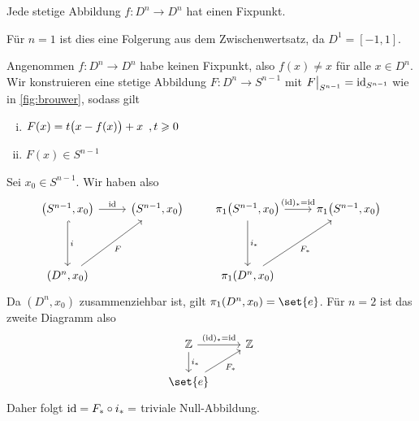 \begin{satz}[{name={Fixpunktsatz von Brouwer}}]
	Jede stetige Abbildung $f \colon D^n \to D^n$ hat einen Fixpunkt.
\end{satz}
\begin{beweis}[für $n\le 2$]
	Für $n=1$ ist dies eine Folgerung aus dem Zwischenwertsatz, da $D^1= [-1,1]$.
	
	Angenommen $f \colon D^n \to D^n$ habe keinen Fixpunkt, also $f(x) \neq x$ für alle $x \in D^n$. 
	Wir konstruieren eine stetige Abbildung $F \colon D^n \to S^{n-1}$ mit $F\big|_{S^{n-1}} = \id_{S^{n-1}}$ wie in \cref{fig:brouwer}, sodass gilt
	
	\begin{minipage}{0.45\textwidth}
		\begin{enumerate}[(i)]
			\item $F(x) = t \enbrace[\big]{x- f(x)} + x \enspace, t\ge 0$
			\item $F(x) \in S^{n-1}$
		\end{enumerate}
	\end{minipage} \quad 
	\begin{minipage}{0.45\textwidth}
		\captionsetup{type=figure, skip=4pt, name=Abb.}
	\end{minipage}
	
	\noindent Sei $x_0 \in S^{n-1}$. Wir haben also
	\[
		\begin{tikzcd}[row sep=4em]
			\enbrace*{S^{n-1}, x_0} \rar{\id} \dar[hook]{i} & \enbrace*{S^{n-1}, x_0} \\
			\enbrace*{D^n, x_0} \urar[swap]{F}
		\end{tikzcd}
		\qquad \begin{tikzcd}[row sep=4em]
			\pi_1 \enbrace*{S^{n-1}, x_0} \rar{(\id)_* = \id}  \dar{i_*}& \pi_1 \enbrace*{S^{n-1}, x_0} \\
			\pi_1 \enbrace*{D^n, x_0} \urar[swap]{F_*}   
		\end{tikzcd}
	\]
	Da $(D^n, x_0)$ zusammenziehbar ist, gilt $\pi_1 \enbrace*{D^n, x_0} = \set{e}$.
	Für $n=2$ ist das zweite Diagramm also
	\[
		\begin{tikzcd}
				\mathbb{Z} \rar{(\id)_* = \id}  \dar{i_*}& \mathbb{Z} \\
				\set{e} \urar[swap]{F_*} 
			\end{tikzcd}
	\]
	Daher folgt $\id = F_* \circ  i_* =$ triviale Null-Abbildung. \light
\end{beweis}

